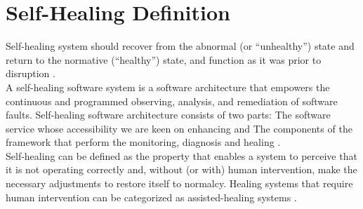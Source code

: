 \chapter{Self-Healing Definition} \label{ch:selfHelingDefinition}

Self-healing system should recover from the abnormal (or “unhealthy”) state and return to the normative (“healthy”) state, and function as it was prior to disruption \cite{Keromytis:SelfHealingSurvey:2011}.\\

A self-healing software system is a software architecture that empowers the continuous and programmed observing, analysis, and remediation of software faults. Self-healing software architecture consists of two parts: The software service whose accessibility we are keen on enhancing and The components of the framework that perform the monitoring, diagnosis and healing \cite{Harald:SelfHealingSurvey:2011}.\\

Self-healing can be defined as the property that enables a system to perceive that it is not
operating correctly and, without (or with) human intervention, make the necessary adjustments to restore itself to normalcy. Healing systems that require human intervention can be categorized as assisted-healing systems \cite{Ghosh:SelfHealingSurvey:2007}.